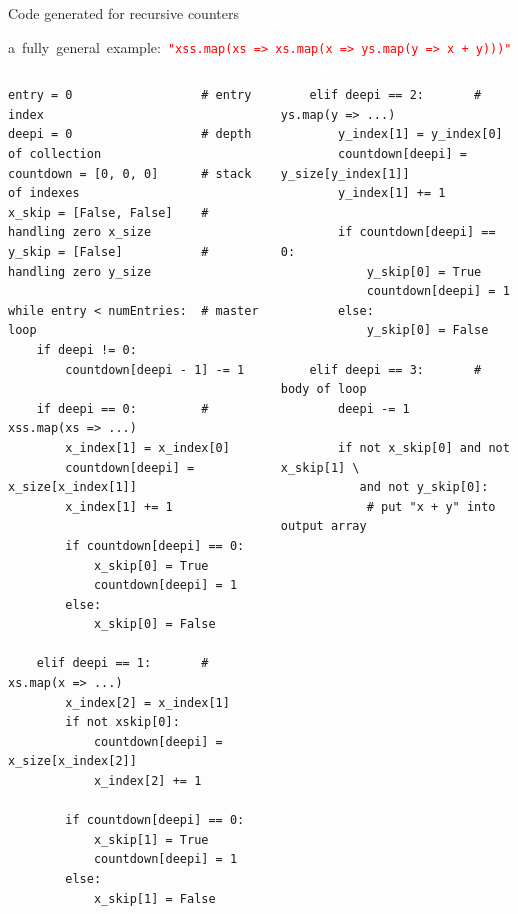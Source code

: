 \documentclass{beamer}
\begin{document}
\begin{frame}[fragile]{Code generated for recursive counters}
\begin{center}
\scriptsize \mbox{\hspace{-1 cm}a fully general example: \textcolor{red}{\tt "xss.map(xs => xs.map(x => ys.map(y => x + y)))"}\hspace{-1 cm}}
\end{center}

\vspace{-0.5 cm}
\makebox[\linewidth]{\rule{\paperwidth}{0.3pt}}

\vspace{-0.5 cm}
\begin{columns}[t]
\tiny
\begin{verbatim}
entry = 0                  # entry index
deepi = 0                  # depth of collection
countdown = [0, 0, 0]      # stack of indexes
x_skip = [False, False]    # handling zero x_size
y_skip = [False]           # handling zero y_size

while entry < numEntries:  # master loop
    if deepi != 0:
        countdown[deepi - 1] -= 1

    if deepi == 0:         # xss.map(xs => ...)
        x_index[1] = x_index[0]
        countdown[deepi] = x_size[x_index[1]]
        x_index[1] += 1

        if countdown[deepi] == 0:
            x_skip[0] = True
            countdown[deepi] = 1
        else:
            x_skip[0] = False

    elif deepi == 1:       # xs.map(x => ...)
        x_index[2] = x_index[1]
        if not xskip[0]:
            countdown[deepi] = x_size[x_index[2]]
            x_index[2] += 1

        if countdown[deepi] == 0:
            x_skip[1] = True
            countdown[deepi] = 1
        else:
            x_skip[1] = False
\end{verbatim}
\tiny
\begin{verbatim}
    elif deepi == 2:       # ys.map(y => ...)
        y_index[1] = y_index[0]
        countdown[deepi] = y_size[y_index[1]]
        y_index[1] += 1

        if countdown[deepi] == 0:
            y_skip[0] = True
            countdown[deepi] = 1
        else:
            y_skip[0] = False

    elif deepi == 3:       # body of loop
        deepi -= 1

        if not x_skip[0] and not x_skip[1] \
           and not y_skip[0]:
            # put "x + y" into output array


\end{verbatim}
\end{columns}
\end{frame}
\end{document}
